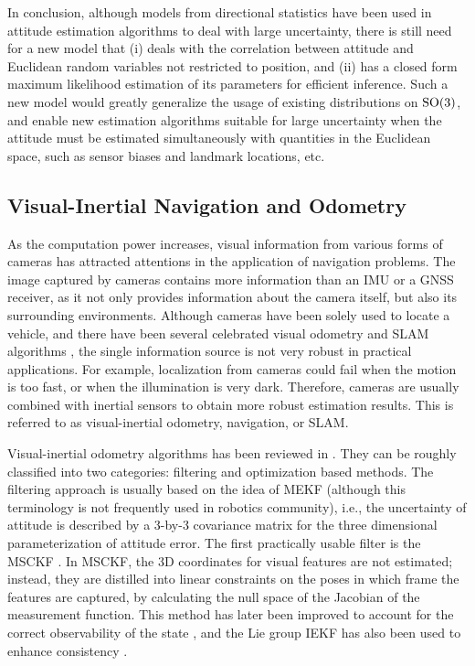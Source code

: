 In conclusion, although models from directional statistics have been used in attitude estimation algorithms to deal with large uncertainty, there is still need for a new model that (i) deals with the correlation between attitude and Euclidean random variables not restricted to position,
and (ii) has a closed form maximum likelihood estimation of its parameters for efficient inference.
Such a new model would greatly generalize the usage of existing distributions on $\mathrm{SO}(3)$, and enable new estimation algorithms suitable for large uncertainty when the attitude must be estimated simultaneously with quantities in the Euclidean space, such as sensor biases and landmark locations, etc.

\subsection{Visual-Inertial Navigation and Odometry} \label{section:intro-review-VIO}

As the computation power increases, visual information from various forms of cameras has attracted attentions in the application of navigation problems.
The image captured by cameras contains more information than an IMU or a GNSS receiver, as it not only provides information about the camera itself, but also its surrounding environments.
Although cameras have been solely used \cite{scaramuzza2011visual} to locate a vehicle, and there have been several celebrated visual odometry and SLAM algorithms \cite{forster2014svo,klein2007parallel,mur2015orb}, the single information source is not very robust in practical applications.
For example, localization from cameras could fail when the motion is too fast, or when the illumination is very dark.
Therefore, cameras are usually combined with inertial sensors to obtain more robust estimation results.
This is referred to as visual-inertial odometry, navigation, or SLAM.

Visual-inertial odometry algorithms has been reviewed in \cite{huang2019visual}.
They can be roughly classified into two categories: filtering and optimization based methods.
The filtering approach is usually based on the idea of MEKF (although this terminology is not frequently used in robotics community), i.e., the uncertainty of attitude is described by a 3-by-3 covariance matrix for the three dimensional parameterization of attitude error.
The first practically usable filter is the MSCKF \cite{mourikis2007multi}.
In MSCKF, the 3D coordinates for visual features are not estimated; instead, they are distilled into linear constraints on the poses in which frame the features are captured, by calculating the null space of the Jacobian of the measurement function.
This method has later been improved to account for the correct observability of the state \cite{hesch2013consistency,li2012improving,li2013high}, and the Lie group IEKF has also been used to enhance consistency \cite{brossard2018invariant}.

